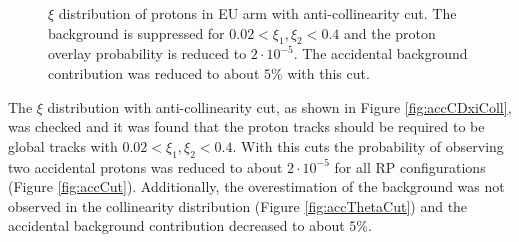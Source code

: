 \begin{enumerate}
\begin{figure}[H]
{\begin{subfigure}[b]{\linewidth}{
				}
		\end{subfigure}
	}
	\parbox{0.48\textwidth}{
		\centering
		\begin{subfigure}[b]{\linewidth}{
				}
		\end{subfigure}
	}
	\caption[x]{$\xi$ distribution of protons in EU arm with anti-collinearity cut. The background is suppressed for  $0.02<\xi_1,\xi_2<0.4$ and the proton overlay probability is reduced to $2\cdot10^{-5}$. The accidental background contribution was reduced to about $5\%$ with this cut.}
\end{figure}
	The $\xi$ distribution  with anti-collinearity cut, as shown in Figure \ref{fig:accCDxiColl}, was checked and it was found that the proton tracks should be required to be global tracks with $0.02<\xi_1,\xi_2<0.4$. With this cuts the probability of observing two accidental protons was reduced to about $2\cdot10^{-5}$ for all RP configurations (Figure \ref{fig:accCut}). Additionally, the overestimation of the background was not observed in the collinearity distribution (Figure \ref{fig:accThetaCut}) and the accidental background contribution decreased to about $5\%$.
\begin{figure}[H]
	\centering
	\parbox{0.48\textwidth}{
		\centering
}
\end{figure}
\end{enumerate}

